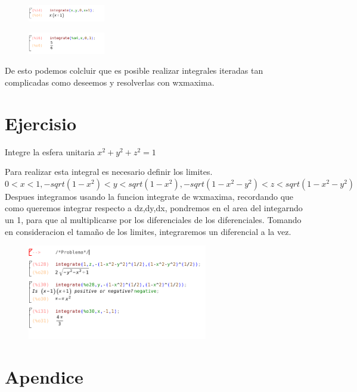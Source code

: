\documentclass[a4paper]{article}
\begin{document}
\begin{figure}[ht!]
\centering
\includegraphics[width=0.3\textwidth]{7.png}
\caption{\label{fig:}}
\end{figure}


\begin{figure}[ht!]
\centering
\includegraphics[width=0.3\textwidth]{9.png}
\caption{\label{fig:}}
\end{figure}

De esto podemos colcluir que es posible realizar integrales iteradas tan complicadas como deseemos y resolverlas con wxmaxima. 
\newpage
\section{Ejercisio}

Integre la esfera unitaria $x^2+y^2+z^2=1$

Para realizar esta integral es necesario definir los limites. 
$0<x<1, -sqrt(1-x^2)<y<sqrt(1-x^2), -sqrt(1-x^2-y^2) <z< sqrt(1-x^2-y^2)$ 
\linebreak
Despues integramos usando la funcion integrate de wxmaxima, recordando que como queremos integrar respecto a dz,dy,dx, pondremos en el area del integarndo un 1, para que al multiplicarse por los diferenciales de los diferenciales. 
\linebreak
Tomando en consideracion el tamaño de los limites, integraremos un diferencial a la vez. 

\begin{figure}[ht!]
\centering
\includegraphics[width=0.7\textwidth]{10.png}
\caption{\label{fig:}}
\end{figure}

\section{Apendice}
\end{document}
